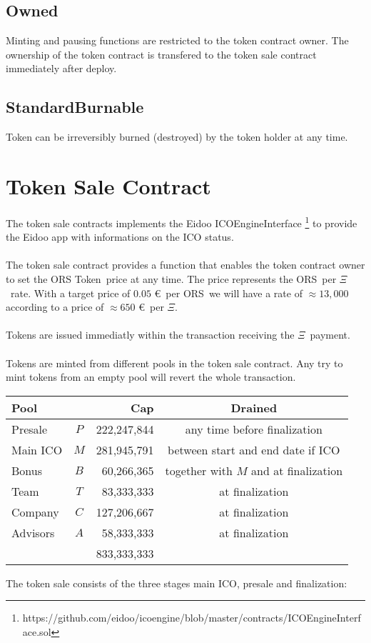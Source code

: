 \documentclass{article}
\newcommand{\ether}{$\Xi$}
\newcommand{\ors}{{\sf ORS}}
\newcommand{\orsT}{{\sf ORS Token}}
\begin{document}
\subsection{Owned}
Minting and pausing functions are restricted to the token contract owner. The
ownership of the token contract is transfered to the token sale contract immediately after deploy.
\subsection{StandardBurnable}
Token can be irreversibly burned (destroyed) by the token holder at any time.

\section{Token Sale Contract}
The token sale contracts implements the Eidoo 
ICOEngineInterface
\footnote{https://github.com/eidoo/icoengine/blob/master/contracts/ICOEngineInterface.sol} 
 to provide the Eidoo app with informations on the ICO status.\\\\ 
 The token sale contract provides a function that enables the token contract owner to set the \orsT \ price at any time. 
 The price represents the \ors  \ per \ether \ rate. With a target price of
 $0.05$ \euro \ per \ors \ we will have a rate of $\approx 13,000$ according to
 a  price of $\approx 650$ \euro \ per \ether. \\\\ Tokens are issued
 immediatly within the transaction receiving the \ether \ payment.
\\\\
\noindent
Tokens are minted from different pools in the token sale contract. Any try to
mint tokens from an empty pool will revert the whole transaction. 

\begin{center}
\begin{table}[h]
\begin{tabular}{l|c|r|c}


Pool & & Cap & Drained \\\hline
Presale & $P$ &222,247,844& any time before finalization\\
Main ICO & $M$ &281,945,791&between start  and end date if ICO\\
Bonus & $B$ & 60,266,365& together with $M$ and at finalization\\
Team &  $T$ & 83,333,333& at finalization \\
Company &  $C$ & 127,206,667& at finalization\\
Advisors &  $A$ & 58,333,333& at finalization\\\hline
&&833,333,333&\\
\end{tabular}
\end{table}
\end{center}
The token sale consists of the three stages main ICO, presale and finalization:
\end{document}
